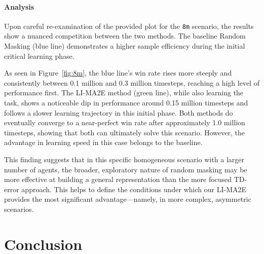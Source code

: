 \paragraph{Analysis}
Upon careful re-examination of the provided plot for the \texttt{8m} scenario, the results show a nuanced competition between the two methods. The baseline Random Masking (blue line) demonstrates a higher sample efficiency during the initial critical learning phase.

As seen in Figure~\ref{fig:8m}, the blue line's win rate rises more steeply and consistently between 0.1 million and 0.3 million timesteps, reaching a high level of performance first. The LI-MA2E method (green line), while also learning the task, shows a noticeable dip in performance around 0.15 million timesteps and follows a slower learning trajectory in this initial phase. Both methods do eventually converge to a near-perfect win rate after approximately 1.0 million timesteps, showing that both can ultimately solve this scenario. However, the advantage in learning speed in this case belongs to the baseline.

This finding suggests that in this specific homogeneous scenario with a larger number of agents, the broader, exploratory nature of random masking may be more effective at building a general representation than the more focused TD-error approach. This helps to define the conditions under which our LI-MA2E provides the most significant advantage—namely, in more complex, asymmetric scenarios.
\section{Conclusion}
\lipsum[2]




